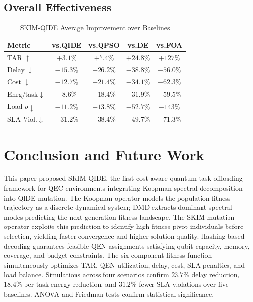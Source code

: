 \documentclass[10pt,twocolumn]{article}
\begin{document}
\subsection{Overall Effectiveness}

\begin{table}[t]
\centering\caption{SKIM-QIDE Average Improvement over Baselines}\label{tab:summary}
\small\renewcommand{\arraystretch}{1.2}
\begin{tabular}{|l|c|c|c|c|}
\hline
Metric & vs.QIDE & vs.QPSO & vs.DE & vs.FOA\\\hline
TAR $\uparrow$        & $+3.1\%$ & $+7.4\%$  & $+24.8\%$ & $+127\%$\\\hline
Delay $\downarrow$    &$-15.3\%$ &$-26.2\%$  &$-38.8\%$  &$-56.0\%$\\\hline
Cost $\downarrow$     &$-12.7\%$ &$-21.4\%$  &$-34.1\%$  &$-62.3\%$\\\hline
Enrg/task$\downarrow$ & $-8.6\%$ &$-18.4\%$  &$-31.9\%$  &$-59.5\%$\\\hline
Load $\rho\downarrow$ &$-11.2\%$ &$-13.8\%$  &$-52.7\%$  &$-143\%$\\\hline
SLA Viol.$\downarrow$ &$-31.2\%$ &$-38.4\%$  &$-49.7\%$  &$-71.3\%$\\\hline
\end{tabular}
\end{table}

\section{Conclusion and Future Work}

This paper proposed SKIM-QIDE, the first cost-aware quantum task offloading framework for QEC environments integrating Koopman spectral decomposition into QIDE mutation. The Koopman operator models the population fitness trajectory as a discrete dynamical system; DMD extracts dominant spectral modes predicting the next-generation fitness landscape. The SKIM mutation operator exploits this prediction to identify high-fitness pivot individuals before selection, yielding faster convergence and higher solution quality. Hashing-based decoding guarantees feasible QEN assignments satisfying qubit capacity, memory, coverage, and budget constraints. The six-component fitness function simultaneously optimizes TAR, QEN utilization, delay, cost, SLA penalties, and load balance. Simulations across four scenarios confirm $23.7\%$ delay reduction, $18.4\%$ per-task energy reduction, and $31.2\%$ fewer SLA violations over five baselines. ANOVA and Friedman tests confirm statistical significance.
\end{document}
